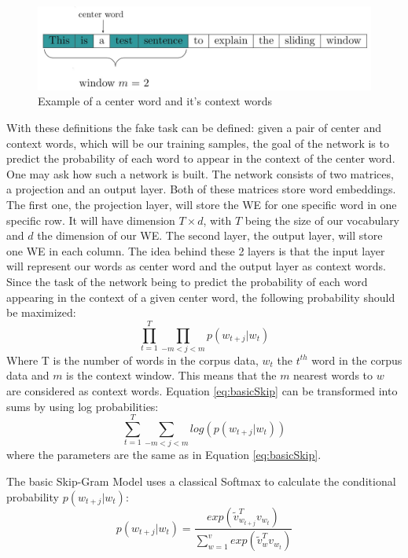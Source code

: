 \begin{figure}[h]
\centering
\includegraphics[scale=0.3]{images/window_ex}
\caption{Example of a center word and it's context words}
\label{fig:window_ex}
\end{figure}
With these definitions the fake task can be defined: given a pair of center and context words, which will be our training samples, the goal of the network is to predict the probability of each word to appear in the context of the center word. One may ask how such a network is built. The network consists of two matrices, a projection and an output layer. Both of these matrices store word embeddings. The first one, the projection layer, will store the WE for one specific word in one specific row. It will have dimension $T\times d$, with $T$ being the size of our vocabulary and $d$ the dimension of our WE. The second layer, the output layer, will store one WE in each column. The idea behind these 2 layers is that the input layer will represent our words as center word and the output layer as context words. Since the task of the network being to predict the probability of each word appearing in the context of a given center word, the following probability should be maximized:\\
\begin{equation} \label{eq:basicSkip}
\prod_{t=1}^T \prod_{-m<j<m} p(w_{t+j}|w_t)
\end{equation}
Where T is the number of words in the corpus data, $w_t$ the $t^{th}$ word in the corpus data and $m$ is the context window. This means that the $m$ nearest words to $w$ are considered as context words.
Equation \ref{eq:basicSkip} can be transformed into sums by using log probabilities:
\begin{equation}
\sum _{t=1}^T \sum_{-m<j<m} log( p(w_{t+j}|w_t) )
\end{equation}
where the parameters are the same as in Equation \ref{eq:basicSkip}.

The basic Skip-Gram Model uses a classical Softmax to calculate the conditional probability $p(w_{t+j}|w_t)$:
\begin{equation} \label{eq:softmax}
p(w_{t+j}|w_t)= \frac{exp( \tilde{v}_{w_{t+j}}^Tv_{w_t})}{\sum_{w=1}^v exp(\tilde{v}_w^Tv_{ w_t})}
\end{equation}

